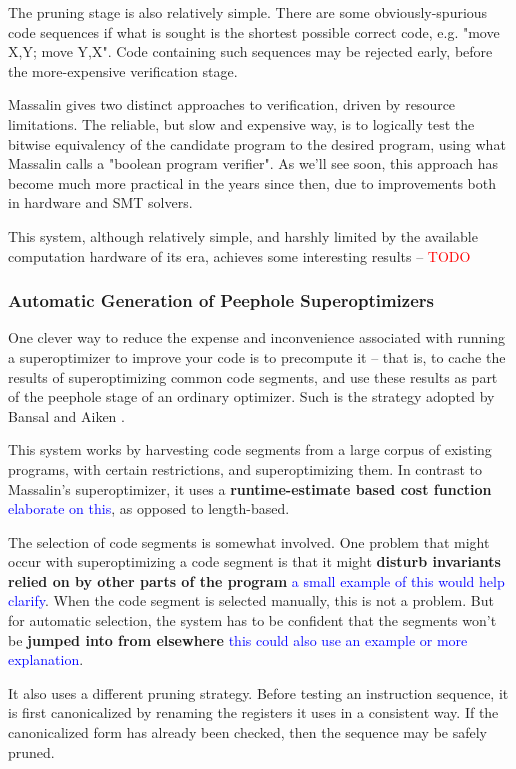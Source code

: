 \documentclass[12pt,twoside]{reedthesis}
\newcommand{\red}[1]{\textcolor{red}{#1}}
\newcommand{\comment}[2]{\textbf{#1} \textcolor{blue}{#2}}
\begin{document}
The pruning stage is also relatively simple. There are some obviously-spurious code sequences if what is sought is the shortest possible correct code, e.g. "move X,Y; move Y,X".
Code containing such sequences may be rejected early, before the more-expensive verification stage.

Massalin gives two distinct approaches to verification, driven by resource limitations.
The reliable, but slow and expensive way, is to logically test the bitwise equivalency of the candidate program to the desired program, using what Massalin calls a "boolean program verifier".
As we'll see soon, this approach has become much more practical in the years since then, due to improvements both in hardware and SMT solvers. 

This system, although relatively simple, and harshly limited by the available computation hardware of its era, achieves some interesting results -- \red{TODO} %

\subsubsection{Automatic Generation of Peephole Superoptimizers}

One clever way to reduce the expense and inconvenience associated with running a superoptimizer to improve your code is to precompute it
-- that is, to cache the results of superoptimizing common code segments, and use these results as part of the peephole stage of an ordinary optimizer.
Such is the strategy adopted by Bansal and Aiken \cite{bansal2006peephole}.

This system works by harvesting code segments from a large corpus of existing programs, with certain restrictions, and superoptimizing them. 
In contrast to Massalin's superoptimizer, it uses a \comment{runtime-estimate based cost function}{elaborate on this}, as opposed to length-based.

The selection of code segments is somewhat involved.
One problem that might occur with superoptimizing a code segment is that it might \comment{disturb invariants relied on by other parts of the program}{a small example of this would help clarify}.
When the code segment is selected manually, this is not a problem.
But for automatic selection, the system has to be confident that the segments won't be \comment{jumped into from elsewhere}{this could also use an example or more explanation}. 

It also uses a different pruning strategy.
Before testing an instruction sequence, it is first canonicalized by renaming the registers it uses in a consistent way.
If the canonicalized form has already been checked, then the sequence may be safely pruned.
\end{document}
